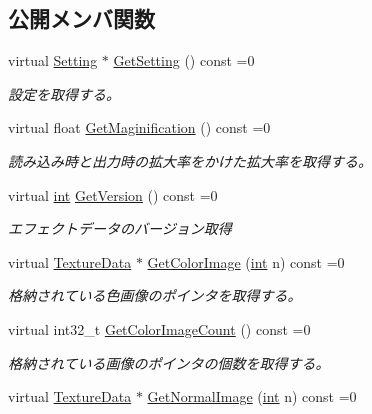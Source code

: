 \subsection*{公開メンバ関数}
\begin{DoxyCompactItemize}
\item 
virtual \mbox{\hyperlink{class_effekseer_1_1_setting}{Setting}} $\ast$ \mbox{\hyperlink{class_effekseer_1_1_effect_ae6a1ef488670df8193befb9f054aded1}{Get\+Setting}} () const =0
\begin{DoxyCompactList}\small\item\em 設定を取得する。 \end{DoxyCompactList}\item 
virtual float \mbox{\hyperlink{class_effekseer_1_1_effect_a602986b894af1ccdc749421648aa380f}{Get\+Maginification}} () const =0
\begin{DoxyCompactList}\small\item\em 読み込み時と出力時の拡大率をかけた拡大率を取得する。 \end{DoxyCompactList}\item 
virtual \mbox{\hyperlink{namespace_effekseer_ace0abf7c2e6947e519ebe8b54cbcc30a}{int}} \mbox{\hyperlink{class_effekseer_1_1_effect_a7dd2d6dd333e2d0cc3edcfea493017db}{Get\+Version}} () const =0
\begin{DoxyCompactList}\small\item\em エフェクトデータのバージョン取得 \end{DoxyCompactList}\item 
virtual \mbox{\hyperlink{struct_effekseer_1_1_texture_data}{Texture\+Data}} $\ast$ \mbox{\hyperlink{class_effekseer_1_1_effect_a8dee1d45117ec1dc3909aa20ac942110}{Get\+Color\+Image}} (\mbox{\hyperlink{namespace_effekseer_ace0abf7c2e6947e519ebe8b54cbcc30a}{int}} n) const =0
\begin{DoxyCompactList}\small\item\em 格納されている色画像のポインタを取得する。 \end{DoxyCompactList}\item 
virtual int32\+\_\+t \mbox{\hyperlink{class_effekseer_1_1_effect_a50ca0307097782d1bced346e8090a56d}{Get\+Color\+Image\+Count}} () const =0
\begin{DoxyCompactList}\small\item\em 格納されている画像のポインタの個数を取得する。 \end{DoxyCompactList}\item 
virtual \mbox{\hyperlink{struct_effekseer_1_1_texture_data}{Texture\+Data}} $\ast$ \mbox{\hyperlink{class_effekseer_1_1_effect_a01db218b1cdb55feb5425aa602c2e010}{Get\+Normal\+Image}} (\mbox{\hyperlink{namespace_effekseer_ace0abf7c2e6947e519ebe8b54cbcc30a}{int}} n) const =0

\end{DoxyCompactItemize}
